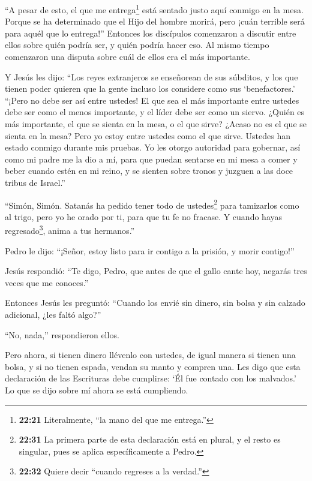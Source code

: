  ``A pesar de esto, el que me entrega\footnote{\textbf{22:21}
  Literalmente, ``la mano del que me entrega.''} está sentado justo aquí
conmigo en la mesa.  Porque se ha determinado que el Hijo
del hombre morirá, pero ¡cuán terrible será para aquél que lo entrega!''
 Entonces los discípulos comenzaron a discutir entre ellos
sobre quién podría ser, y quién podría hacer eso.  Al mismo
tiempo comenzaron una disputa sobre cuál de ellos era el más importante.

 Y Jesús les dijo: ``Los reyes extranjeros se enseñorean de
sus súbditos, y los que tienen poder quieren que la gente incluso los
considere como sus `benefactores.'  ``¡Pero no debe ser así
entre ustedes! El que sea el más importante entre ustedes debe ser como
el menos importante, y el líder debe ser como un siervo. 
¿Quién es más importante, el que se sienta en la mesa, o el que sirve?
¿Acaso no es el que se sienta en la mesa? Pero yo estoy entre ustedes
como el que sirve.  Ustedes han estado conmigo durante mis
pruebas.  Yo les otorgo autoridad para gobernar, así como
mi padre me la dio a mí,  para que puedan sentarse en mi
mesa a comer y beber cuando estén en mi reino, y se sienten sobre tronos
y juzguen a las doce tribus de Israel.''

 ``Simón, Simón. Satanás ha pedido tener todo de
ustedes\footnote{\textbf{22:31} La primera parte de esta declaración
  está en plural, y el resto es singular, pues se aplica específicamente
  a Pedro.} para tamizarlos como al trigo,  pero yo he
orado por ti, para que tu fe no fracase. Y cuando hayas
regresado\footnote{\textbf{22:32} Quiere decir ``cuando regreses a la
  verdad.''}, anima a tus hermanos.''

 Pedro le dijo: ``¡Señor, estoy listo para ir contigo a la
prisión, y morir contigo!''

 Jesús respondió: ``Te digo, Pedro, que antes de que el
gallo cante hoy, negarás tres veces que me conoces.''

 Entonces Jesús les preguntó: ``Cuando los envié sin
dinero, sin bolsa y sin calzado adicional, ¿les faltó algo?''

``No, nada,'' respondieron ellos.

 Pero ahora, si tienen dinero llévenlo con ustedes, de
igual manera si tienen una bolsa, y si no tienen espada, vendan su manto
y compren una.  Les digo que esta declaración de las
Escrituras debe cumplirse: `Él fue contado con los malvados.' Lo que se
dijo sobre mí ahora se está cumpliendo.

